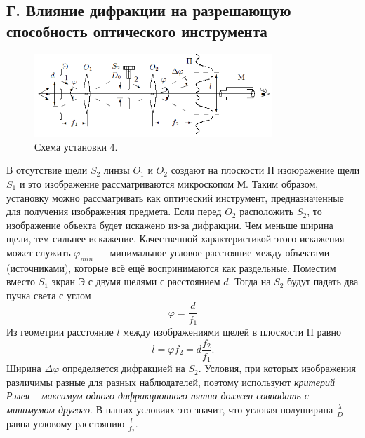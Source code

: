 \documentclass[a4paper, 12pt]{article}%
\begin{document}
	\subsection*{Г. Влияние дифракции на разрешающую способность оптического инструмента}
	\begin{figure}[h]
		\includegraphics[width = 0.8\textwidth]{images/431-6.png}
		\centering
		\caption{Схема установки 4.}
	\end{figure}
	В отсутствие щели $S_2$ линзы $O_1$ и $O_2$ создают на плоскости П изоюражение щели $S_1$ и это изображение рассматриваются микроскопом М. Таким образом, установку можно рассматривать как оптический инструмент, предназначенные для получения изображения предмета. Если перед $O_2$ расположить $S_2$, то изображение объекта будет искажено из-за дифракции. Чем меньше ширина щели, тем сильнее искажение. Качественной характеристикой этого искажения может служить $\varphi_{min}$ --- минимальное угловое расстояние между объектами (источниками), которые всё ещё воспринимаются как раздельные. Поместим вместо $S_1$ экран Э с двумя щелями с расстоянием $d$. Тогда на $S_2$ будут падать два пучка света с углом
	\begin{equation}
	\varphi = \dfrac{d}{f_1}
	\end{equation}
	Из геометрии расстояние $l$ между изображениями щелей в плоскости П равно 
	\begin{equation}
	l = \varphi f_2 = d \dfrac{f_2}{f_1}.
	\end{equation}
	Ширина $\Delta \varphi$ определяется дифракцией на $S_2$. Условия, при которых изображения различимы разные для разных наблюдателей, поэтому используют \textit{критерий Рэлея} -- \textit{максимум одного дифракционного пятна должен совпадать с минимумом другого}. В наших условиях это значит, что угловая полуширина $\frac{\lambda}{D}$ равна угловому расстоянию $\frac{l}{f_2}$.
\end{document}
